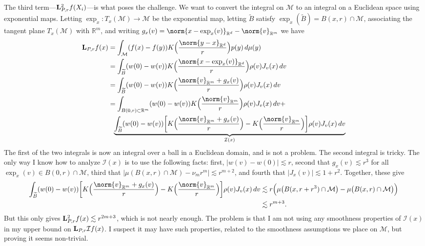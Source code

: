 \documentclass{article}
\newcommand{\Reals}{\mathbb{R}}
\newcommand{\abs}[1]{\left \lvert #1 \right \rvert}
\newcommand{\1}{\mathbf{1}}
\newcommand{\Rd}{\Reals^d}
\newcommand{\Lap}{{\bf L}}
\newcommand{\wt}[1]{\widetilde{#1}}
\newcommand{\mc}[1]{\mathcal{#1}}
\theoremstyle{alden}
\theoremstyle{aldenthm}
\theoremstyle{definition}
\theoremstyle{remark}
\begin{document}
The third term---$\Lap_{P,r}^2f(X_i)$---is what poses the challenge. We want to convert the integral on $\mc{M}$ to an integral on a Euclidean space using exponential maps. Letting $\exp_x:T_x(\mc{M}) \to \mc{M}$ be the exponential map, letting $\wt{B}$ satisfy $\exp_x(\wt{B}) = B(x,r) \cap \mc{M}$, associating the tangent plane $T_x(\mc{M})$ with $\Reals^m$, and writing $g_x(v) = \norm{x - \exp_x(v)}_{\Rd} - \norm{v}_{\Reals^m}$ we have
\begin{align*}
\Lap_{P,r}f(x) & = \int_{\mc{M}} (f(x) - f(y)) K\Bigl(\frac{\norm{y - x}_{\Rd}}{r}\Bigr) p(y) \,d\mu(y) \\
& = \int_{\wt{B}} (w(0) - w(v)) K\Bigl(\frac{\norm{x - \exp_x(v)}_{\Rd}}{r}\Bigr) \rho(v) J_v(x) \,dv \\
& = \int_{\wt{B}} (w(0) - w(v)) K\Bigl(\frac{\norm{v}_{\Reals^m} + g_x(v)}{r}\Bigr) \rho(v) J_v(x) \,dv \\
& = \int_{B(0,r) \subset \Reals^m} (w(0) - w(v)) K\Bigl(\frac{\norm{v}_{\Reals^m}}{r}\Bigr) \rho(v) J_v(x) \,dv +~~\\
&~~ \underbrace{\int_{\wt{B}} (w(0) - w(v)) \biggl[K\Bigl(\frac{\norm{v}_{\Reals^m} + g_x(v)}{r}\Bigr) - K\Bigl(\frac{\norm{v}_{\Reals^m}}{r}\Bigr)\biggr] \rho(v) J_v(x) \,dv}_{\mc{I}(x)}
\end{align*}
The first of the two integrals is now an integral over a ball in a Euclidean domain, and is not a problem. The second integral is tricky. The only way I know how to analyze $\mc{I}(x)$ is to use the following facts: first, $\abs{w(v) - w(0)} \lesssim r$, second that $g_x(v) \lesssim r^3$ for all $\exp_x(v) \in B(0,r) \cap \mc{M}$, third that $\abs{\mu(B(x,r) \cap {\mc{M}}) - \nu_m r^m} \lesssim r^{m + 2}$, and fourth that $\abs{J_x(v)} \lesssim 1 + r^2$. Together, these give
\begin{align*}
\int_{\wt{B}} (w(0) - w(v)) \biggl[K\Bigl(\frac{\norm{v}_{\Reals^m} + g_x(v)}{r}\Bigr) - K\Bigl(\frac{\norm{v}_{\Reals^m}}{r}\Bigr)\biggr] \rho(v) J_v(x) \,dv  & \lesssim r \Bigl(\mu\bigl(B(x,r + r^3) \cap {\mc{M}} \bigr) - \mu\bigl(B(x,r) \cap {\mc{M}}\bigr)\Bigr)  \\
& \lesssim r^{m + 3}.
\end{align*}
But this only gives $\Lap_{P,r}^2f(x) \lesssim r^{2m + 3}$, which is not nearly enough. The problem is that I am not using any smoothness properties of $\mc{I}(x)$ in my upper bound on $\Lap_{P,r}\mc{I}f(x)$. I suspect it may have such properties, related to the smoothness assumptions we place on $\mc{M}$, but proving it seems non-trivial.
\end{document}
